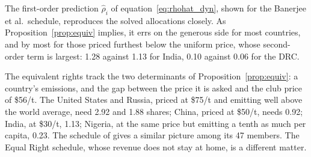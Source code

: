 \documentclass[12pt,english]{article}
\theoremstyle{remark}
\begin{document}
The first-order prediction $\hat\rho_i$ of equation~\eqref{eq:rhohat_dyn}, shown for the Banerjee et al.\ schedule, reproduces the solved allocations closely. As Proposition~\ref{prop:equiv} implies, it errs on the generous side for most countries, and by most for those priced furthest below the uniform price, whose second-order term is largest: 1.28 against 1.13 for India, 0.10 against 0.06 for the DRC.

The equivalent rights track the two determinants of Proposition~\ref{prop:equiv}: a country's emissions, and the gap between the price it is asked and the club price of \$56/t. 
The United States and Russia, priced at \$75/t and emitting well above the world average, need 2.92 and 1.88 shares; China, priced at \$50/t, needs 0.92; India, at \$30/t, 1.13; Nigeria, at the same price but emitting a tenth as much per capita, 0.23. The schedule of \citet{wolfram_building_2025} gives a similar picture among its 47 members. The Equal Right schedule, whose revenue does not stay at home, is a different matter.
\end{document}
